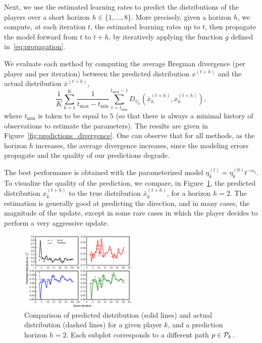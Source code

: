 \documentclass{sig-alternate-ipsn13}
\begin{document}
Next, we use the estimated learning rates to predict the distributions of the players over a short horizon $h \in \{1, \dots, 8\}$. More precisely, given a horizon $h$, we compute, at each iteration $t$, the estimated learning rates up to $t$, then propagate the model forward from $t$ to $t+h$, by iteratively applying the function $g$ defined in~\eqref{eq:propagation}.

We evaluate each method by computing the average Bregman divergence (per player and per iteration) between the predicted distribution $x^{(t+h)}$ and the actual distribution $\bar x^{(t+h)}$,
\[
\frac{1}{K} \sum_{k = 1}^K \frac{1}{t_{\max} - t_{\min}} \sum_{t = t_{\min}}^{t_{\max}-1} D_{\psi_k} (\bar x^{(t+h)}_h, x^{(t+h)}_k),
\]
where $t_{\min}$ is taken to be equal to $5$ (so that there is always a minimal history of observations to estimate the parameters). The results are given in Figure~\ref{fig:predictions_divergence}. One can observe that for all methods, as the horizon $h$ increases, the average divergence increases, since the modeling errors propagate and the quality of our predictions degrade.

The best performance is obtained with the parameterized model $\eta^{(t)}_k = \eta^{(0)}_k t^{-\alpha_k}$. To visualize the quality of the prediction, we compare, in Figure~\ref{fig:parameterized}, the predicted distribution $x^{(t+h)}_k$ to the true distribution $\bar x^{(t+h)}_k$, for a horizon $h = 2$. The estimation is generally good at predicting the direction, and in many cases, the magnitude of the update, except in some rare cases in which the player decides to perform a very aggressive update.

\begin{figure}[h]
  \centering
  \includegraphics[width=0.5\textwidth]{images/two_steps_predictions}
  \caption{\footnotesize Comparison of predicted distribution (solid lines) and actual distribution (dashed lines) for a given player $k$, and a prediction horizon $h = 2$. Each subplot corresponds to a different path $p \in \mathcal{P}_k$.}
  \label{fig:parameterized}
\end{figure}
\end{document}
